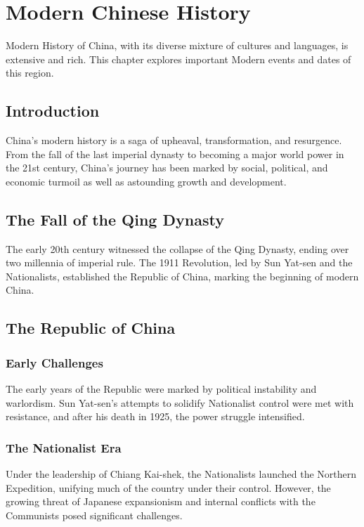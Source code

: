\documentclass[a4paper,12pt]{book}
\begin{document}
\chapter{Modern Chinese History}
\label{ch:modern-chinese-history}

Modern History of China, with its diverse mixture of cultures and languages, is extensive and rich. This chapter explores important Modern events and dates of this region.

\section{Introduction}
\label{sec:introduction}
China's modern history is a saga of upheaval, transformation, and resurgence. From the fall of the last imperial dynasty to becoming a major world power in the 21st century, China's journey has been marked by social, political, and economic turmoil as well as astounding growth and development.

\section{The Fall of the Qing Dynasty}
\label{sec:fall-qing-dynasty}
The early 20th century witnessed the collapse of the Qing Dynasty, ending over two millennia of imperial rule. The 1911 Revolution, led by Sun Yat-sen and the Nationalists, established the Republic of China, marking the beginning of modern China.

\section{The Republic of China}
\label{sec:republic-china}
\subsection{Early Challenges}
The early years of the Republic were marked by political instability and warlordism. Sun Yat-sen's attempts to solidify Nationalist control were met with resistance, and after his death in 1925, the power struggle intensified.

\subsection{The Nationalist Era}
Under the leadership of Chiang Kai-shek, the Nationalists launched the Northern Expedition, unifying much of the country under their control. However, the growing threat of Japanese expansionism and internal conflicts with the Communists posed significant challenges.
\end{document}
